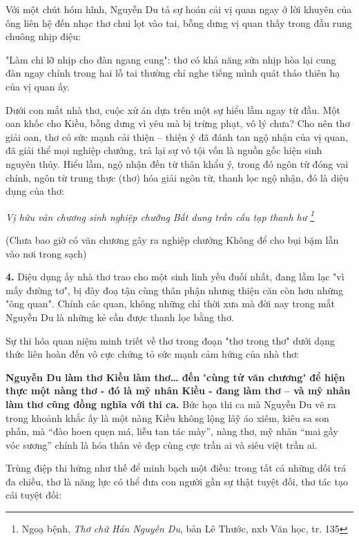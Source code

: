 \documentclass[../main.tex]{subfiles}
\begin{document}
\begin{multicols}{2}
Với một chút hóm hĩnh, Nguyễn Du tả sự hoán cải vị quan ngay ở lời khuyên của ông liên hệ đến nhạc thơ chui lọt vào tai, bỗng dưng vị quan thấy trong đầu rung chuông nhịp điệu: 
 
"Làm chi lỡ nhịp cho đàn ngang cung": thơ có khả năng sửa nhịp hòa lại cung đàn ngay chính trong hai lỗ tai thường chỉ nghe tiếng mình quát tháo thiên hạ của vị quan ấy. 
 
Dưới con mắt nhà thơ, cuộc xử án dựa trên một sự hiểu lầm ngay từ đầu. Một oan khốc cho Kiều, bỗng dưng vì yêu mà bị trừng phạt, vô lý chưa? Cho nên thơ giải oan, thơ có sức mạnh cải thiện –   thiện ý đã đánh tan ngộ nhận của vị quan, đã giải thể mọi nghiệp chướng, trả lại sự vô tội vốn là nguồn gốc hiện sinh nguyên thủy. Hiểu lầm, ngộ nhận đến từ thân khẩu ý, trong đó ngôn từ đóng vai chính, ngôn từ trung thực (thơ) hóa giải ngôn từ, thanh lọc ngộ nhận, đó là diệu dụng của thơ: 
\begin{blockquote}
        
\textit{Vị hữu văn chương sinh nghiệp chướng}        
\textit{Bất dung trần cấu tạp thanh hư \footnote{
Ngoạ bệnh, \textit{Thơ chữ Hán Nguyễn Du}, bản Lê Thước, nxb Văn học,  tr. 135} } 
        
(Chưa bao giờ có văn chương gây ra nghiệp chướng        
Không để cho bụi bặm lẫn vào nơi trong sạch) 

\end{blockquote}
 
\textbf{4.} Diệu dụng ấy nhà thơ trao cho một sinh linh yếu đuối nhất, đang lầm lạc "vì mấy đường tơ", bị đày đoạ tận cùng thân phận nhưng thiện căn còn hơn những "ông quan". Chính các quan, không những chỉ thời xưa mà đời nay trong mắt Nguyễn Du là những kẻ cần được thanh lọc bằng thơ.  
 
Sự thi hóa quan niệm minh triết về thơ trong đoạn "thơ trong thơ" dưới dạng thức liên hoàn đến vô cực chứng tỏ sức mạnh cảm hứng của nhà thơ: 
 
\textbf{Nguyễn Du làm thơ Kiều làm thơ… đến }"\textbf{cùng tử văn chương}"\textbf{ để hiện thực một nàng thơ - đó là mỹ nhân Kiều - đang làm thơ – và mỹ nhân làm thơ cũng đồng nghĩa với thi ca. }Bức họa thi ca mà Nguyễn Du vẽ ra trong khoảnh khắc ấy là một nàng Kiều không lộng lâỹ áo xiêm, kiêu sa son phấn, mà “đào hoen quẹn má, liễu tan tác mày”, nàng thơ, mỹ nhân “mai gầy vóc sương” chính là hóa thân vẻ đẹp cùng cực trần ai và siêu việt trần ai. 
 
Trùng điệp thi hứng như thế để minh bạch một điều: trong tất cả những dối trá đa chiều, thơ là năng lực có thể đưa con người gần sự thật tuyệt đối, thơ tác tạo cái tuyệt đối: 
  

\end{multicols}
\end{document}
